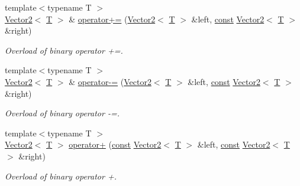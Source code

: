 \begin{DoxyCompactItemize}
{\footnotesize template$<$typename T $>$ }\\\hyperlink{classsf_1_1_vector2}{Vector2}$<$ \hyperlink{curses_8priv_8h_a5ef253115820acf7d27f3c5c3b02a0f0}{T} $>$ \& \hyperlink{classsf_1_1_vector2_ad4b7a9d355d57790bfc7df0ade8bb628}{operator+=} (\hyperlink{classsf_1_1_vector2}{Vector2}$<$ \hyperlink{curses_8priv_8h_a5ef253115820acf7d27f3c5c3b02a0f0}{T} $>$ \&left, \hyperlink{term__entry_8h_a57bd63ce7f9a353488880e3de6692d5a}{const} \hyperlink{classsf_1_1_vector2}{Vector2}$<$ \hyperlink{curses_8priv_8h_a5ef253115820acf7d27f3c5c3b02a0f0}{T} $>$ \&right)
\begin{DoxyCompactList}\small\item\em Overload of binary operator +=. \end{DoxyCompactList}\item 
{\footnotesize template$<$typename T $>$ }\\\hyperlink{classsf_1_1_vector2}{Vector2}$<$ \hyperlink{curses_8priv_8h_a5ef253115820acf7d27f3c5c3b02a0f0}{T} $>$ \& \hyperlink{classsf_1_1_vector2_a30a5a12ad03c9a3a982a0a313bf84e6f}{operator-\/=} (\hyperlink{classsf_1_1_vector2}{Vector2}$<$ \hyperlink{curses_8priv_8h_a5ef253115820acf7d27f3c5c3b02a0f0}{T} $>$ \&left, \hyperlink{term__entry_8h_a57bd63ce7f9a353488880e3de6692d5a}{const} \hyperlink{classsf_1_1_vector2}{Vector2}$<$ \hyperlink{curses_8priv_8h_a5ef253115820acf7d27f3c5c3b02a0f0}{T} $>$ \&right)
\begin{DoxyCompactList}\small\item\em Overload of binary operator -\/=. \end{DoxyCompactList}\item 
{\footnotesize template$<$typename T $>$ }\\\hyperlink{classsf_1_1_vector2}{Vector2}$<$ \hyperlink{curses_8priv_8h_a5ef253115820acf7d27f3c5c3b02a0f0}{T} $>$ \hyperlink{classsf_1_1_vector2_a72421239823c38a6b780c86a710ead07}{operator+} (\hyperlink{term__entry_8h_a57bd63ce7f9a353488880e3de6692d5a}{const} \hyperlink{classsf_1_1_vector2}{Vector2}$<$ \hyperlink{curses_8priv_8h_a5ef253115820acf7d27f3c5c3b02a0f0}{T} $>$ \&left, \hyperlink{term__entry_8h_a57bd63ce7f9a353488880e3de6692d5a}{const} \hyperlink{classsf_1_1_vector2}{Vector2}$<$ \hyperlink{curses_8priv_8h_a5ef253115820acf7d27f3c5c3b02a0f0}{T} $>$ \&right)
\begin{DoxyCompactList}\small\item\em Overload of binary operator +. \end{DoxyCompactList}\item 

\end{DoxyCompactItemize}
